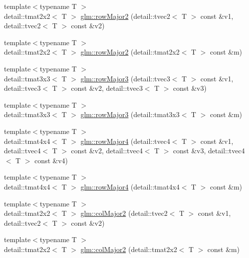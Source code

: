 \begin{DoxyCompactItemize}
\item 
{\footnotesize template$<$typename T $>$ }\\detail\+::tmat2x2$<$ T $>$ \hyperlink{group__gtx__matrix__major__storage_ga7491478a44956d58b7e69aaed553cc6d}{glm\+::row\+Major2} (detail\+::tvec2$<$ T $>$ const \&v1, detail\+::tvec2$<$ T $>$ const \&v2)
\item 
{\footnotesize template$<$typename T $>$ }\\detail\+::tmat2x2$<$ T $>$ \hyperlink{group__gtx__matrix__major__storage_ga28d01bef195da95bb53cd4f92c2a682a}{glm\+::row\+Major2} (detail\+::tmat2x2$<$ T $>$ const \&m)
\item 
{\footnotesize template$<$typename T $>$ }\\detail\+::tmat3x3$<$ T $>$ \hyperlink{group__gtx__matrix__major__storage_ga68e32da2311bfb10a997b696f10c94e0}{glm\+::row\+Major3} (detail\+::tvec3$<$ T $>$ const \&v1, detail\+::tvec3$<$ T $>$ const \&v2, detail\+::tvec3$<$ T $>$ const \&v3)
\item 
{\footnotesize template$<$typename T $>$ }\\detail\+::tmat3x3$<$ T $>$ \hyperlink{group__gtx__matrix__major__storage_gac5ff8d95a98875264033a1e941b93139}{glm\+::row\+Major3} (detail\+::tmat3x3$<$ T $>$ const \&m)
\item 
{\footnotesize template$<$typename T $>$ }\\detail\+::tmat4x4$<$ T $>$ \hyperlink{group__gtx__matrix__major__storage_ga3b12b05239e6cfdab406281a8c3371fc}{glm\+::row\+Major4} (detail\+::tvec4$<$ T $>$ const \&v1, detail\+::tvec4$<$ T $>$ const \&v2, detail\+::tvec4$<$ T $>$ const \&v3, detail\+::tvec4$<$ T $>$ const \&v4)
\item 
{\footnotesize template$<$typename T $>$ }\\detail\+::tmat4x4$<$ T $>$ \hyperlink{group__gtx__matrix__major__storage_gaf60f42778d5018aee654d59d34ff720d}{glm\+::row\+Major4} (detail\+::tmat4x4$<$ T $>$ const \&m)
\item 
{\footnotesize template$<$typename T $>$ }\\detail\+::tmat2x2$<$ T $>$ \hyperlink{group__gtx__matrix__major__storage_gaa188eb2ad0b0922f251bf1d0f4d85043}{glm\+::col\+Major2} (detail\+::tvec2$<$ T $>$ const \&v1, detail\+::tvec2$<$ T $>$ const \&v2)
\item 
{\footnotesize template$<$typename T $>$ }\\detail\+::tmat2x2$<$ T $>$ \hyperlink{group__gtx__matrix__major__storage_gae5acce8fa0778cfa98fa7e7420114c94}{glm\+::col\+Major2} (detail\+::tmat2x2$<$ T $>$ const \&m)

\end{DoxyCompactItemize}
